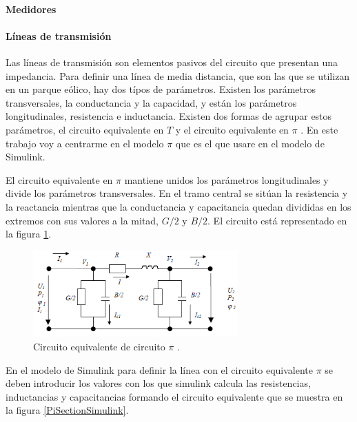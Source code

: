 \documentclass{book}
\begin{document}
		\paragraph {Medidores}

		\paragraph {L\'ineas de transmisi\'on}
Las l\'ineas de transmisi\'on son elementos pasivos del circuito que presentan una impedancia. Para definir una l\'inea de media distancia, que son las que se utilizan en un parque e\'olico, hay dos t\'ipos de par\'ametros. Existen los par\'ametros transversales, la conductancia y la capacidad, y est\'an los  par\'ametros longitudinales, resistencia e inductancia. Existen dos formas de agrupar estos par\'ametros, el circuito equivalente en $T$ y el circuito equivalente en $\pi$ \cite{LibroRedesLineas}. En este trabajo voy a centrarme en el modelo $\pi$ que es el que usare en el modelo de Simulink.  \par

El circuito equivalente en $\pi$ mantiene unidos los par\'ametros longitudinales y divide los par\'ametros transversales. En el tramo central se sit\'uan la resistencia y la reactancia mientras que la conductancia y capacitancia quedan divididas en los extremos con sus valores a la mitad, $G/2$ y $B/2$. El circuito est\'a representado en la figura \ref{CircuitoPi}. \par 

\begin{figure}[h!]
\centering
\includegraphics[width=0.7\textwidth]{CircuitoPi.PNG}
\caption{Circuito equivalente de circuito $\pi$ \cite{LibroRedesLineas}. }
\label{CircuitoPi}
\end{figure} \par

En el modelo de Simulink para definir la l\'inea con el circuito equivalente  $\pi$ se deben introducir los valores con los que simulink calcula las resistencias, inductancias y capacitancias formando el circuito equivalente que se muestra en la figura \ref{PiSectionSimulink}.  \par 
\end{document}
